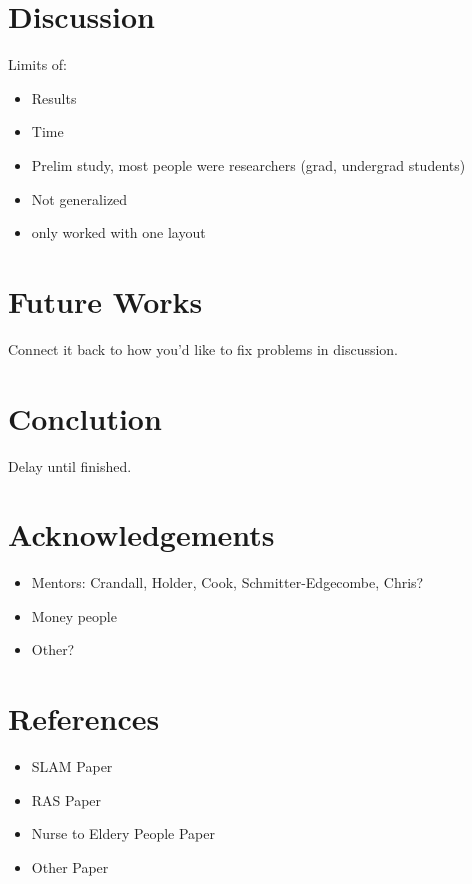 \documentclass[11pt, conference, a4paper]{IEEEtran}
\begin{document}
\section{Discussion}
Limits of:
\begin{itemize}
    \item Results
    \item Time
    \item Prelim study, most people were researchers (grad, undergrad students)
    \item Not generalized
    \item only worked with one layout
\end{itemize}


\section{Future Works}
Connect it back to how you'd like to fix problems in discussion.


\section{Conclution}
Delay until finished.


\section{Acknowledgements}
\begin{itemize}
    \item Mentors: Crandall, Holder, Cook, Schmitter-Edgecombe, Chris?
    \item Money people
    \item Other?
\end{itemize}


\section{References}
\begin{itemize}
    \item SLAM Paper
    \item RAS Paper
    \item Nurse to Eldery People Paper
    \item Other Paper
\end{itemize}
\end{document}
